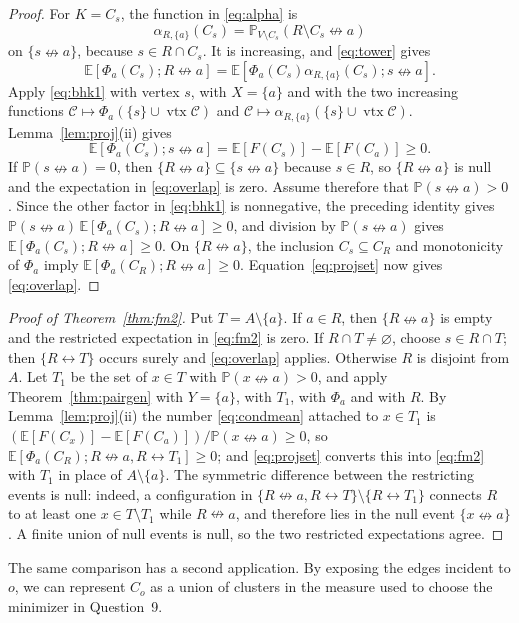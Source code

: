 \documentclass[11pt]{article}
\theoremstyle{definition}
\theoremstyle{remark}
\newcommand{\PP}{\mathbb P}
\newcommand{\EE}{\mathbb E}
\newcommand{\con}{\leftrightarrow}
\newcommand{\ncon}{\nleftrightarrow}
\newcommand{\eC}{\mathcal C}
\DeclareMathOperator{\vtx}{vtx}
\begin{document}
\begin{proof}
For $K=C_s$, the function in \eqref{eq:alpha} is
\[
 \alpha_{R,\{a\}}(C_s)
 =\PP_{V\setminus C_s}(R\setminus C_s\ncon a)
\]
on $\{s\ncon a\}$, because $s\in R\cap C_s$. It is increasing, and
\eqref{eq:tower} gives
\[
 \EE[\Phi_a(C_s);R\ncon a]
 =\EE[\Phi_a(C_s)\alpha_{R,\{a\}}(C_s);s\ncon a].
\]
Apply \eqref{eq:bhk1} with
vertex $s$, with $X=\{a\}$ and with the two increasing functions
$\eC\mapsto\Phi_a(\{s\}\cup\vtx\eC)$ and $\eC\mapsto\alpha_{R,\{a\}}(\{s\}\cup\vtx\eC)$.
Lemma~\ref{lem:proj}(ii) gives
\[
 \EE[\Phi_a(C_s);s\ncon a]
 =\EE[F(C_s)]-\EE[F(C_a)]\geq0.
\]
If $\PP(s\ncon a)=0$, then $\{R\ncon a\}\subseteq\{s\ncon a\}$ because $s\in R$, so
$\{R\ncon a\}$ is null and the expectation in \eqref{eq:overlap} is zero. Assume therefore
that $\PP(s\ncon a)>0$. Since the other factor in \eqref{eq:bhk1} is nonnegative, the
preceding identity gives $\PP(s\ncon a)\,\EE[\Phi_a(C_s);R\ncon a]\geq0$, and division by
$\PP(s\ncon a)$ gives $\EE[\Phi_a(C_s);R\ncon a]\geq0$. On $\{R\ncon a\}$, the inclusion
$C_s\subseteq C_R$ and monotonicity of $\Phi_a$ imply
$\EE[\Phi_a(C_R);R\ncon a]\geq0$. Equation~\eqref{eq:projset} now gives
\eqref{eq:overlap}.
\end{proof}

\begin{proof}[Proof of Theorem~\ref{thm:fm2}]
Put $T=A\setminus\{a\}$. If $a\in R$, then $\{R\ncon
a\}$ is empty and the restricted expectation in \eqref{eq:fm2} is zero. If
$R\cap T\neq\varnothing$, choose $s\in R\cap T$; then $\{R\con T\}$ occurs surely and
\eqref{eq:overlap} applies. Otherwise $R$ is
disjoint from $A$. Let $T_1$ be the set of $x\in T$ with $\PP(x\ncon a)>0$, and apply
Theorem~\ref{thm:pairgen} with $Y=\{a\}$, with $T_1$, with $\Phi_a$ and with $R$. By
Lemma~\ref{lem:proj}(ii) the number \eqref{eq:condmean} attached to $x\in T_1$ is
$(\EE[F(C_x)]-\EE[F(C_a)])/\PP(x\ncon a)\geq0$, so $\EE[\Phi_a(C_R);R\ncon a,R\con
T_1]\geq0$; and \eqref{eq:projset} converts this into \eqref{eq:fm2} with $T_1$ in place of
$A\setminus\{a\}$. The symmetric difference between the restricting events is null:
indeed, a configuration in $\{R\ncon a,R\con T\}\setminus\{R\con T_1\}$ connects $R$ to
at least one $x\in T\setminus T_1$ while $R\ncon a$, and therefore lies in the null event
$\{x\ncon a\}$. A finite union of null events is null, so the two restricted expectations
agree.
\end{proof}

The same comparison has a second application. By exposing the edges incident to $o$, we
can represent $C_o$ as a union of clusters in the measure used to choose the minimizer in
Question~9.
\end{document}
